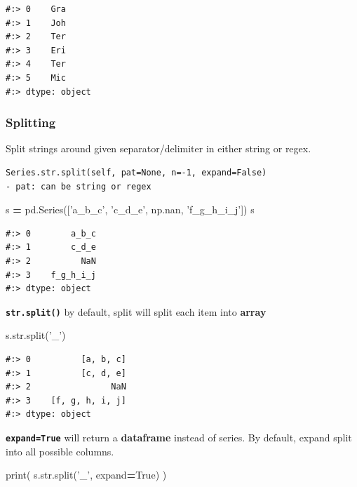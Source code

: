 \documentclass[
]{book}
\newenvironment{Shaded}{\begin{snugshade}}{\end{snugshade}}
\newcommand{\BuiltInTok}[1]{#1}
\newcommand{\NormalTok}[1]{#1}
\newcommand{\OperatorTok}[1]{\textcolor[rgb]{0.43,0.43,0.43}{\textbf{#1}}}
\newcommand{\StringTok}[1]{\textcolor[rgb]{0.5,0.5,0.5}{#1}}
\newcommand{\VariableTok}[1]{\textcolor[rgb]{0,0,0}{#1}}
\begin{document}
\begin{verbatim}
#:> 0    Gra
#:> 1    Joh
#:> 2    Ter
#:> 3    Eri
#:> 4    Ter
#:> 5    Mic
#:> dtype: object
\end{verbatim}

\hypertarget{splitting}{%
\subsubsection{Splitting}\label{splitting}}

Split strings around given separator/delimiter in either string or regex.

\begin{verbatim}
Series.str.split(self, pat=None, n=-1, expand=False)
- pat: can be string or regex
\end{verbatim}

\begin{Shaded}
\begin{Highlighting}[]
\NormalTok{s }\OperatorTok{=}\NormalTok{ pd.Series([}\StringTok{'a_b_c'}\NormalTok{, }\StringTok{'c_d_e'}\NormalTok{, np.nan, }\StringTok{'f_g_h_i_j'}\NormalTok{])}
\NormalTok{s}
\end{Highlighting}
\end{Shaded}

\begin{verbatim}
#:> 0        a_b_c
#:> 1        c_d_e
#:> 2          NaN
#:> 3    f_g_h_i_j
#:> dtype: object
\end{verbatim}

\textbf{\texttt{str.split()}} by default, split will split each item into \textbf{array}

\begin{Shaded}
\begin{Highlighting}[]
\NormalTok{s.}\BuiltInTok{str}\NormalTok{.split(}\StringTok{'_'}\NormalTok{)}
\end{Highlighting}
\end{Shaded}

\begin{verbatim}
#:> 0          [a, b, c]
#:> 1          [c, d, e]
#:> 2                NaN
#:> 3    [f, g, h, i, j]
#:> dtype: object
\end{verbatim}

\textbf{\texttt{expand=True}} will return a \textbf{dataframe} instead of series. By default, expand split into all possible columns.

\begin{Shaded}
\begin{Highlighting}[]
\BuiltInTok{print}\NormalTok{( s.}\BuiltInTok{str}\NormalTok{.split(}\StringTok{'_'}\NormalTok{, expand}\OperatorTok{=}\VariableTok{True}\NormalTok{) )}
\end{Highlighting}
\end{Shaded}
\end{document}
